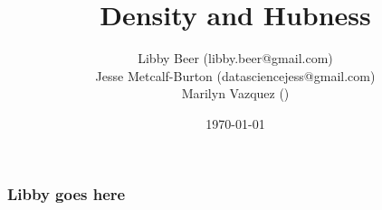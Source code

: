 \documentclass{beamer}
\title[Hubness]{Density and Hubness} %
\author{Libby Beer (libby.beer@gmail.com)\\
Jesse Metcalf-Burton (datasciencejess@gmail.com)\\
Marilyn Vazquez ()} %
\date{\today} %
\begin{document}
\begin{frame}
\titlepage %
\end{frame}







\begin{frame}
\frametitle{Libby goes here}

\end{frame}
\end{document}
